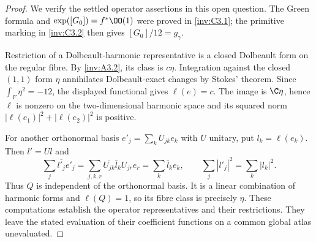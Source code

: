 \begin{proof}

We verify the settled operator assertions in this open question.
The Green formula and $\exp([G_0])=f^*\OO(1)$ were proved in
\ref{inv:C3.1}; the primitive marking in \ref{inv:C3.2} then gives
$[G_0]/12=g_\gamma$.

Restriction of a Dolbeault-harmonic representative is a closed
Dolbeault form on the regular fibre. By \ref{inv:A3.2}, its class
is $c\eta$. Integration against the closed $(1,1)$ form $\eta$
annihilates Dolbeault-exact changes by Stokes' theorem. Since
$\int_F\eta^2=-12$, the displayed functional gives $\ell(e)=c$.
The image is $\C\eta$, hence $\ell$ is nonzero on the
 two-dimensional harmonic space and its squared norm
$|\ell(e_1)|^2+|\ell(e_2)|^2$ is positive.

For another orthonormal basis $e'_j=\sum_k U_{jk}e_k$ with
$U$ unitary, put $l_k=\ell(e_k)$. Then $l'=Ul$ and
\[
 \sum_j\overline{l'_j}e'_j
 =\sum_{j,k,r}\overline{U_{jk}}\bar l_k U_{jr}e_r
 =\sum_k\bar l_ke_k,
 \qquad \sum_j|l'_j|^2=\sum_k|l_k|^2.
\]
Thus $Q$ is independent of the orthonormal basis. It is a linear
combination of harmonic forms and $\ell(Q)=1$, so its fibre class
is precisely $\eta$. These computations establish the operator
representatives and their restrictions. They leave the stated
evaluation of their coefficient functions on a common global
atlas unevaluated.

\end{proof}
